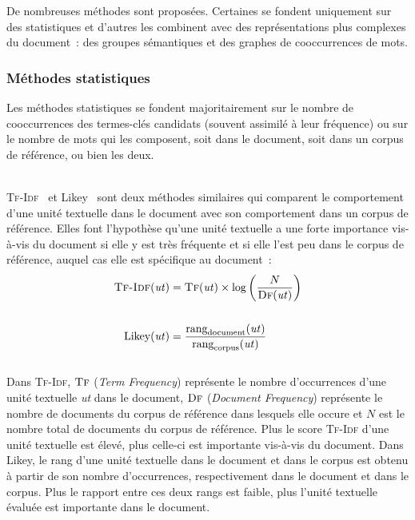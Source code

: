       De nombreuses méthodes sont proposées. Certaines se fondent uniquement
      sur des statistiques et d'autres les combinent avec des représentations
      plus complexes du document~: des groupes sémantiques et des
      graphes de cooccurrences de mots.

      \subsubsection{Méthodes statistiques}
      \label{subsubsec:main-state_of_the_art-automatic_keyphrase_extraction-unsupervised_keyphrase_extraction-statistical_approaches}
        Les méthodes statistiques se fondent majoritairement sur le nombre de
        cooccurrences des termes-clés candidats (souvent assimilé à leur
        fréquence) ou sur le nombre de mots qui les composent, soit dans le
        document, soit dans un corpus de référence, ou bien les deux.

        ~\\\textsc{Tf-Idf}~\cite{jones1972tfidf} et Likey~\cite{paukkeri2010likey}
        sont deux méthodes similaires qui comparent le comportement d'une unité
        textuelle dans le document avec son comportement dans un corpus de
        référence. Elles font l'hypothèse qu'une unité textuelle a une forte
        importance vis-à-vis du document si elle y est très fréquente et si elle
        l'est peu dans le corpus de référence, auquel cas elle est spécifique au
        document~:
        \begin{align}
          \text{\textsc{Tf-Idf}}(\text{\textit{ut}}) &= \textsc{Tf}(\text{\textit{ut}}) \times \log\left(\frac{N}{\textsc{Df}(\text{\textit{ut}})}\right) \label{math:tfidf}\\
          \notag\\
          \text{Likey}(\text{\textit{ut}}) &= \frac{\text{rang}_{\text{document}}(\text{\textit{ut}})}{\text{rang}_{\text{corpus}}(\text{\textit{ut}})} \label{math:likey}
        \end{align}\\
        Dans \textsc{Tf-Idf}, $\textsc{Tf}$ (\textit{Term Frequency}) représente
        le nombre d'occurrences d'une unité textuelle \textit{ut} dans le
        document, $\textsc{Df}$ (\textit{Document Frequency}) représente le
        nombre de documents du corpus de référence dans lesquels elle occure
        et $N$ est le nombre total de documents du corpus de référence. Plus le
        score \textsc{Tf-Idf} d'une unité textuelle est élevé, plus celle-ci est
        importante vis-à-vis du document. Dans Likey, le rang d'une unité
        textuelle dans le document et dans le corpus est obtenu à partir de son
        nombre d'occurrences, respectivement dans le document et dans le corpus.
        Plus le rapport entre ces deux rangs est faible, plus l'unité textuelle
        évaluée est importante dans le document.

